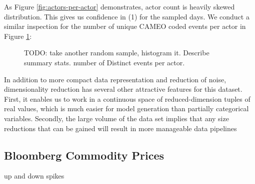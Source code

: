 As Figure \ref{fig:actors-per-actor} demonstrates, actor count is heavily skewed distribution. This gives us confidence in (1) for the sampled days. We conduct a similar inspection for the number of unique CAMEO coded events per actor in Figure \ref{fig:events-per-actor}:

\begin{figure}[ht]
\vskip 0.2in
\begin{center}
\caption{TODO: take another random sample, histogram it. Describe summary stats. number of Distinct events per actor.}
\end{center}
\vskip -0.2in
\label{fig:events-per-actor}
\end{figure} 

In addition to more compact data representation and reduction of noise, dimensionality reduction has several other attractive features for this dataset. First, it enables us to work in a continuous space of reduced-dimension tuples of real values, which is much easier for model generation than partially categorical variables. Secondly, the large volume of the data set implies that any size reductions that can be gained will result in more manageable data pipelines

\subsection{Bloomberg Commodity Prices}

up and down spikes